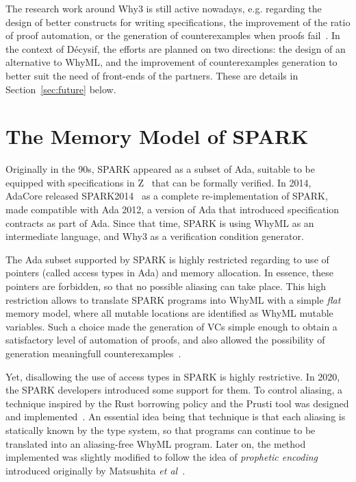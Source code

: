 \documentclass[a4paper,11pt]{article}
\begin{document}
The research work around Why3 is still active nowadays, e.g. regarding
the design of better constructs for writing specifications, the
improvement of the ratio of proof automation, or the generation of
counterexamples when proofs
fail~\cite{dailler18jlamp,becker21fide}. In the context of Décysif,
the efforts are planned on two directions: the design of an
alternative to WhyML, and the improvement of counterexamples
generation to better suit the need of front-ends of the partners. These
are details in Section~\ref{sec:future} below.

\section{The Memory Model of SPARK}
\label{sec:spark}


Originally in the 90s, SPARK appeared as a subset of Ada, suitable to be
equipped with specifications in Z~\cite{carre90} that can be formally
verified. In 2014, AdaCore released SPARK2014~\cite{mccormick15} as a complete
re-implementation of SPARK, made compatible with Ada 2012, a version of Ada that
introduced specification contracts as part of Ada. Since that time, SPARK is
using WhyML as an intermediate language, and Why3 as a verification condition
generator.

The Ada subset supported by SPARK is highly restricted regarding to use of
pointers (called access types in Ada) and memory allocation. In essence, these
pointers are forbidden, so that no possible aliasing can take place. This high
restriction allows to translate SPARK programs into WhyML with a simple
\emph{flat} memory model, where all mutable locations are identified as WhyML
mutable variables. Such a choice made the generation of VCs simple enough to
obtain a satisfactory level of automation of proofs, and also allowed the
possibility of generation meaningfull counterexamples~\cite{dailler18jlamp}.

Yet, disallowing the use of access types in SPARK is highly restrictive. In
2020, the SPARK developers introduced some support for them. To control aliasing,
a technique inspired by the Rust borrowing policy and the Prusti tool was
designed and implemented~\cite{dross20cav,jaloyan20icfem}. An essential idea
being that technique is that each aliasing is statically known by the type
system, so that programs can continue to be translated into an aliasing-free
WhyML program. Later on, the method implemented was slightly modified to follow
the idea of \emph{prophetic encoding} introduced originally by Matsushita \emph{et
al}~\cite{matsushita20esop}.
\end{document}
